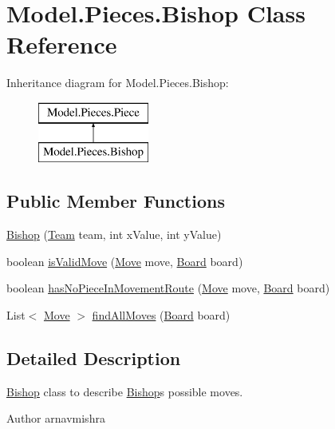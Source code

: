 \hypertarget{class_model_1_1_pieces_1_1_bishop}{}\section{Model.\+Pieces.\+Bishop Class Reference}
\label{class_model_1_1_pieces_1_1_bishop}
Inheritance diagram for Model.\+Pieces.\+Bishop\+:\begin{figure}[H]
\begin{center}
\leavevmode
\includegraphics[height=2.000000cm]{class_model_1_1_pieces_1_1_bishop}
\end{center}
\end{figure}
\subsection*{Public Member Functions}
\begin{DoxyCompactItemize}
\item 
\hyperlink{class_model_1_1_pieces_1_1_bishop_a5f383759e28a0def1f6139861c9afa94}{Bishop} (\hyperlink{class_model_1_1_team}{Team} team, int x\+Value, int y\+Value)
\item 
boolean \hyperlink{class_model_1_1_pieces_1_1_bishop_a7767730f9b26965b39385080947c0f6a}{is\+Valid\+Move} (\hyperlink{class_model_1_1_move}{Move} move, \hyperlink{class_model_1_1_board}{Board} board)
\item 
boolean \hyperlink{class_model_1_1_pieces_1_1_bishop_a5d2d653911307254ade5f9b25b4afaf7}{has\+No\+Piece\+In\+Movement\+Route} (\hyperlink{class_model_1_1_move}{Move} move, \hyperlink{class_model_1_1_board}{Board} board)
\item 
List$<$ \hyperlink{class_model_1_1_move}{Move} $>$ \hyperlink{class_model_1_1_pieces_1_1_bishop_a67fdc956c6f82e0b513aae4b86998b28}{find\+All\+Moves} (\hyperlink{class_model_1_1_board}{Board} board)
\end{DoxyCompactItemize}


\subsection{Detailed Description}
\hyperlink{class_model_1_1_pieces_1_1_bishop}{Bishop} class to describe \hyperlink{class_model_1_1_pieces_1_1_bishop}{Bishop}\textquotesingle{}s possible moves. \begin{DoxyAuthor}{Author}
arnavmishra 
\end{DoxyAuthor}


